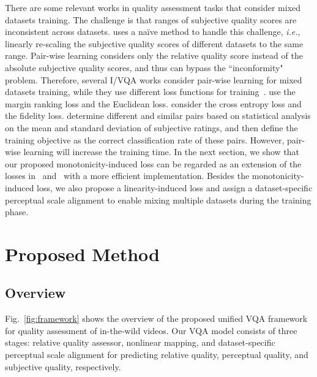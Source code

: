 \documentclass[twocolumn]{svjour3}          \smartqed  \usepackage{graphicx}
\begin{document}
There are some relevant works in quality assessment tasks that consider mixed datasets training.
The challenge is that ranges of subjective quality scores are inconsistent across datasets.
\citet{korhonen2019two} uses a na\"ive method to handle this challenge, \textit{i.e.}, linearly re-scaling the subjective quality scores of different datasets to the same range. 
Pair-wise learning considers only the relative quality score instead of the absolute subjective quality scores, and thus can bypass the ``inconformity" problem.
Therefore, several I/VQA works consider pair-wise learning for mixed datasets training, while they use different loss functions for training~\citep{yang2019cnn,zhang2019learning,krasula2019training}. 
\citet{yang2019cnn} use the margin ranking loss and the Euclidean loss.
\citet{zhang2019learning} consider the cross entropy loss and the fidelity loss.
\citet{krasula2019training} determine different and similar pairs based on statistical analysis on the mean and standard deviation of subjective ratings, and then define the training objective as the correct classification rate of these pairs. 
However, pair-wise learning will increase the training time. In the next section, we show that our proposed monotonicity-induced loss can be regarded as an extension of the losses in~\citet{yang2019cnn} and~\citet{zhang2019learning} with a more efficient implementation. Besides the monotonicity-induced loss, we also propose a linearity-induced loss and assign a dataset-specific perceptual scale alignment to enable mixing multiple datasets during the training phase.

\section{Proposed Method}
\label{sec:method}
\subsection{Overview}
Fig.~\ref{fig:framework} shows the overview of the proposed unified VQA framework for quality assessment of in-the-wild videos. 
Our VQA model consists of three stages: relative quality assessor, nonlinear mapping, and dataset-specific perceptual scale alignment for predicting relative quality, perceptual quality, and subjective quality, respectively. 
\end{document}
